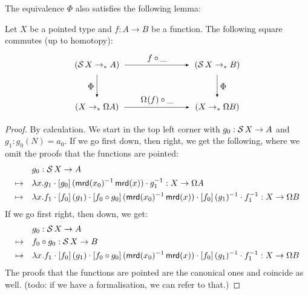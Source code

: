 \documentclass[english,a4]{article}
\renewcommand{\ap}[1]{\left[{#1}\right]}
\begin{document}
The equivalence $\Phi$ also satisfies the following lemma:

\begin{lemma} \label{lem:ap-Sigma}
    Let $X$ be a pointed type and $f : A \to B$ be a function.
    The following square commutes (up to homotopy):
    \begin{equation}
    \begin{tikzpicture}[x=5cm,y=-1.75cm,baseline=(current bounding box.center)]
    \tikzset{arrow/.style={shorten >=0.1cm,shorten <=.1cm,-latex}}
    \node (A) at (0,0) {$(\susp X \to_* A)$}; 
    \node (D) at (1,0) {$(\susp X \to_* B)$}; 
    \node (B) at (0,1) {$(X \to_* \Omega A)$}; 
    \node (C) at (1,1) {$(X \to_* \Omega B)$}; 
    
    \draw[arrow] (A) to node [above] {$f \circ \_$} (D);
    \draw[arrow] (A) to node [left] {$\Phi$} (B);
    \draw[arrow] (B) to node [above] {$\loopspace\null (f) \circ \_$} (C);
    \draw[arrow] (D) to node [right] {$\Phi$} (C);
    \end{tikzpicture}
    \end{equation}
\end{lemma}
\begin{proof}
    By calculation.
    We start in the top left corner with $g_0 : \operatorname{\mathcal S} X \to A$ and $g_1 : g_0(N) = a_0$. If we go first down, then right, we get the following, where we omit the proofs that the functions are pointed:
    \begin{equation}
    \begin{alignedat}{5}
    &\quad && g_0 : \susp X \to A & \\
    \mapsto &&& \lambda x. g_1 \cdot \ap {g_0}(\mrd(x_0)^{-1} \mrd(x)) \cdot g_1^{-1} : X \to \Omega A \\
    \mapsto &&& \lambda x. f_1 \cdot \ap {f_0}(g_1) \cdot  \ap {f_0 \circ g_0}(\mrd(x_0)^{-1} \mrd(x)) \cdot \ap {f_0}(g_1)^{-1} \cdot f_1^{-1} : X \to \Omega B
    \end{alignedat}
    \end{equation}
    If we go first right, then down, we get:
    \begin{equation}
    \begin{alignedat}{5}
    &\quad && g_0 : \susp X \to A & \\
    \mapsto &&&  f_0 \circ g_0 : \susp X \to B \\
    \mapsto &&& \lambda x. f_1 \cdot \ap {f_0}(g_1) \cdot  \ap {f_0 \circ g_0}(\mrd(x_0)^{-1} \mrd(x)) \cdot \ap {f_0}(g_1)^{-1} \cdot f_1^{-1} : X \to \Omega B
    \end{alignedat}
    \end{equation}
    The proofs that the functions are pointed are the canonical ones and coincide as well. (todo: if we have a formalisation, we can refer to that.) 
\end{proof}
\end{document}
